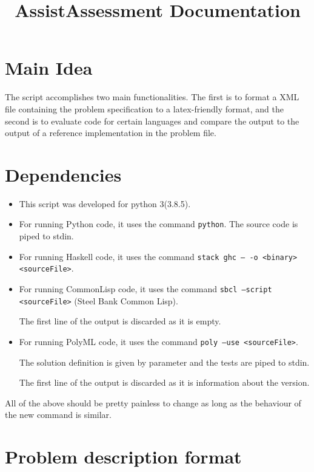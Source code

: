 \documentclass[a4paper,12pt]{article}
\title{AssistAssessment Documentation}
\author{}
\date{}
\begin{document}
    
\maketitle

\section{Main Idea}

The script accomplishes two main functionalities. The first is to format a XML file containing the problem specification to a latex-friendly format, and the second is to evaluate code for certain languages and compare the output to the output of a reference implementation in the problem file.

\section{Dependencies}

\begin{itemize}
 \item This script was developed for python 3(3.8.5).
 
 \item For running Python code, it uses the command \texttt{python}. The source code is piped to stdin.
 
 \item For running Haskell code, it uses the command \texttt{stack ghc -- -o <binary> <sourceFile>}.
 
 \item For running CommonLisp code, it uses the command \texttt{sbcl --script <sourceFile>} (Steel Bank Common Lisp).
 
 The first line of the output is discarded as it is empty.
 
 \item For running PolyML code, it uses the command \texttt{poly --use <sourceFile>}. 
 
 The solution definition is given by parameter and the tests are piped to stdin. 
 
 The first line of the output is discarded as it is information about the version.
\end{itemize}

All of the above should be pretty painless to change as long as the behaviour of the new command is similar.



\section{Problem description format}
\end{document}
